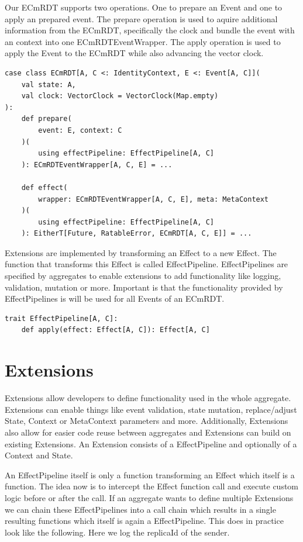 \documentclass[
	ngerman,
	ruledheaders=section,   %
	class=report,		    %
	thesis={type=bachelor}, %
	accentcolor=9c,			%
	custommargins=true,    %
	marginpar=false,        %
	parskip=half-,          %
	fontsize=11pt,          %
]{tudapub}
\begin{document}
Our ECmRDT supports two operations. One to prepare an Event and one to apply an prepared event. The prepare operation is used to aquire additional information from the ECmRDT, specifically the clock and bundle the event with an context into one ECmRDTEventWrapper. The apply operation is used to apply the Event to the ECmRDT while also advancing the vector clock.

\begin{lstlisting}
case class ECmRDT[A, C <: IdentityContext, E <: Event[A, C]](
	val state: A,
	val clock: VectorClock = VectorClock(Map.empty)
):
	def prepare(
		event: E, context: C
	)(
		using effectPipeline: EffectPipeline[A, C]
	): ECmRDTEventWrapper[A, C, E] = ...

	def effect(
		wrapper: ECmRDTEventWrapper[A, C, E], meta: MetaContext
	)(
		using effectPipeline: EffectPipeline[A, C]
	): EitherT[Future, RatableError, ECmRDT[A, C, E]] = ...
\end{lstlisting}

Extensions are implemented by transforming an Effect to a new Effect. The function that transforms this Effect is called EffectPipeline. EffectPipelines are specified by aggregates to enable extensions to add functionality like logging, validation, mutation or more. Important is that the functionality provided by EffectPipelines is will be used for all Events of an ECmRDT. 

\begin{lstlisting}
trait EffectPipeline[A, C]:
	def apply(effect: Effect[A, C]): Effect[A, C]
\end{lstlisting}

\section{Extensions}
Extensions allow developers to define functionality used in the whole aggregate. Extensions can enable things like event validation, state mutation, replace/adjust State, Context or MetaContext parameters and more. Additionally, Extensions also allow for easier code reuse between aggregates and Extensions can build on existing Extensions. An Extension consists of a EffectPipeline and optionally of a Context and State. 

An EffectPipeline itself is only a function transforming an Effect which itself is a function. The idea now is to intercept the Effect function call and execute custom logic before or after the call. If an aggregate wants to define multiple Extensions we can chain these EffectPipelines into a call chain which results in a single resulting functions which itself is again a EffectPipeline. This does in practice look like the following. Here we log the replicaId of the sender.
\end{document}
